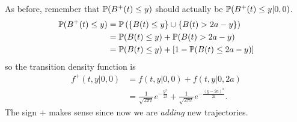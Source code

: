 \documentclass[12pt]{report}
\begin{document}
\begin{enumerate}
As before, remember that $\mathbb{P}(B^{+}(t)\leq y)$ should actually be $\mathbb{P}(B^{+}(t)\leq y|0,0)$.
\begin{align*}
	\mathbb{P}(B^{+}(t)\leq y)&=\mathbb{P}\left(\{B(t)\leq y\}\cup\{B(t)>2a-y\}\right)\\
	&=\mathbb{P}(B(t)\leq y)+\mathbb{P}(B(t)>2a-y)\\
	&=\mathbb{P}(B(t)\leq y)+[1-\mathbb{P}(B(t)\leq 2a-y)]
\end{align*}
so the transition density function is
\begin{align*}
	f^{+}(t,y|0,0)&=f(t,y|0,0)+f(t,y|0,2a)\\
	&=\frac{1}{\sqrt{2\pi t}}e^{-\frac{y^{2}}{2t}}+\frac{1}{\sqrt{2\pi t}}e^{-\frac{(y-2a)^{2}}{2t}}.
\end{align*}
The sign $+$ makes sense since now we are \textit{adding} new trajectories.
\end{enumerate}
\end{document}
